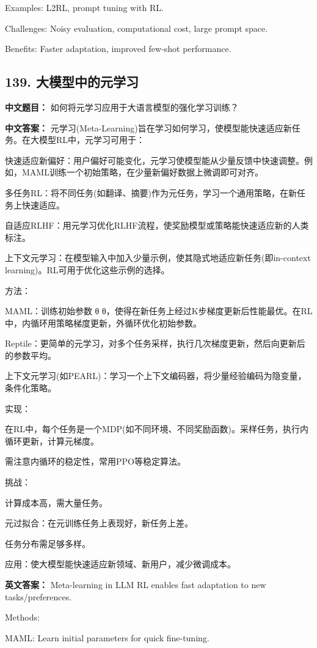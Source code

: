 \documentclass[10pt,a4paper]{ctexart}
\begin{document}
Examples: L2RL, prompt tuning with RL.

Challenges: Noisy evaluation, computational cost, large prompt space.

Benefits: Faster adaptation, improved few-shot performance.

\subsection*{139. 大模型中的元学习}
\textbf{中文题目：} 如何将元学习应用于大语言模型的强化学习训练？

\textbf{中文答案：}
元学习(Meta-Learning)旨在学习如何学习，使模型能快速适应新任务。在大模型RL中，元学习可用于：

快速适应新偏好：用户偏好可能变化，元学习使模型能从少量反馈中快速调整。例如，MAML训练一个初始策略，在少量新偏好数据上微调即可对齐。

多任务RL：将不同任务(如翻译、摘要)作为元任务，学习一个通用策略，在新任务上快速适应。

自适应RLHF：用元学习优化RLHF流程，使奖励模型或策略能快速适应新的人类标注。

上下文元学习：在模型输入中加入少量示例，使其隐式地适应新任务(即in-context learning)。RL可用于优化这些示例的选择。

方法：

MAML：训练初始参数 
θ
θ，使得在新任务上经过K步梯度更新后性能最优。在RL中，内循环用策略梯度更新，外循环优化初始参数。

Reptile：更简单的元学习，对多个任务采样，执行几次梯度更新，然后向更新后的参数平均。

上下文元学习(如PEARL)：学习一个上下文编码器，将少量经验编码为隐变量，条件化策略。

实现：

在RL中，每个任务是一个MDP(如不同环境、不同奖励函数)。采样任务，执行内循环更新，计算元梯度。

需注意内循环的稳定性，常用PPO等稳定算法。

挑战：

计算成本高，需大量任务。

元过拟合：在元训练任务上表现好，新任务上差。

任务分布需足够多样。

应用：使大模型能快速适应新领域、新用户，减少微调成本。

\textbf{英文答案：}
Meta-learning in LLM RL enables fast adaptation to new tasks/preferences.

Methods:

MAML: Learn initial parameters for quick fine-tuning.
\end{document}
